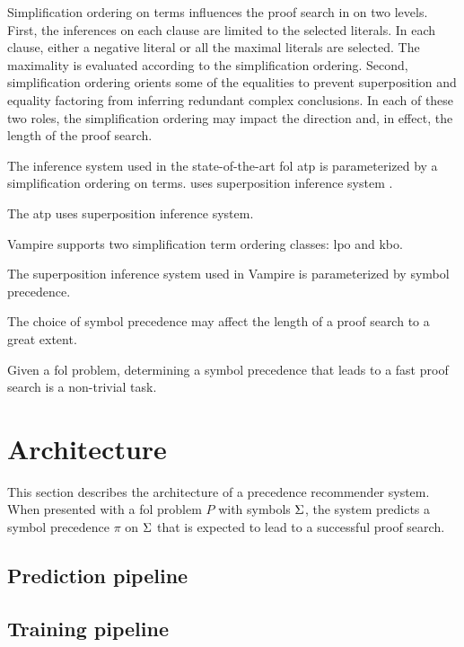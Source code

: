 \documentclass{article}
\begin{document}
Simplification ordering on terms
influences the proof search in \vampire{} on two levels.
First, the inferences on each clause are limited
to the selected literals.
In each clause,
either a negative literal or all the maximal literals are selected.
The maximality is evaluated
according to the simplification ordering.
Second, simplification ordering orients some of the equalities
to prevent superposition and equality factoring
from inferring redundant complex conclusions.
In each of these two roles,
the simplification ordering may impact the direction and,
in effect, the length of the proof search.

The inference system used in the state-of-the-art \gls{fol} \gls{atp} \vampire{}
is parameterized by a simplification ordering on terms.
\vampire{} uses superposition inference system \cite{}.

The \gls{atp} \vampire{} uses superposition inference system.


Vampire supports two simplification term ordering classes:
\gls{lpo} and \gls{kbo}.

The superposition inference system \cite{} used in Vampire is parameterized
by symbol precedence.


The choice of symbol precedence may affect the length of a proof search to a great extent.

Given a \gls{fol} problem,
determining a symbol precedence that leads to a fast proof search is a non-trivial task.

\section{Architecture}
\label{sec:architecture}

This section describes the architecture of a precedence recommender system.
When presented with a \gls{fol} problem $P$ with symbols $\operatorname{\Sigma}$,
the system predicts a symbol precedence $\pi$ on $\operatorname{\Sigma}$
that is expected to lead to a successful proof search.

\subsection{Prediction pipeline}

\subsection{Training pipeline}
\end{document}
